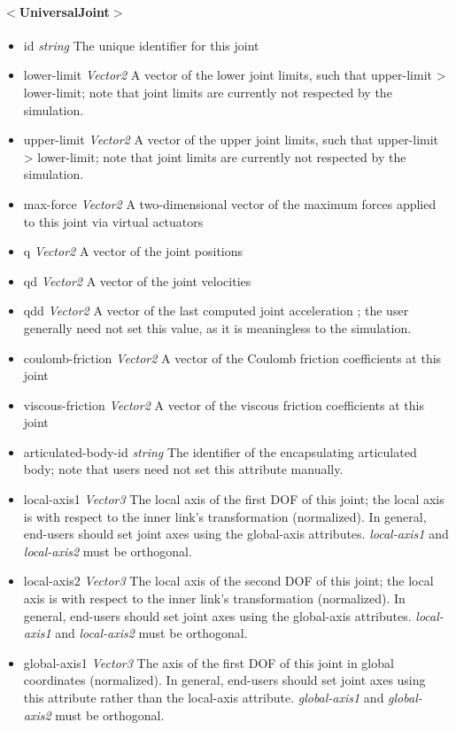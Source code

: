 \documentclass{article}
\begin{document}
\begin{landscape}
\begin{itemize}
\paragraph{$<$UniversalJoint$>$}
\begin{itemize}
 \item id  \emph{string}  The unique identifier for this joint
 \item lower-limit  \emph{Vector2}  A vector of the lower joint limits, such that upper-limit > lower-limit; note that joint limits are currently not respected by the simulation. 
 \item upper-limit  \emph{Vector2}  A vector of the upper joint limits, such that upper-limit > lower-limit; note that joint limits are currently not respected by the simulation.
 \item max-force  \emph{Vector2}  A two-dimensional vector of the maximum forces applied to this joint via virtual actuators 
 \item q  \emph{Vector2}  A vector of the joint positions 
 \item qd  \emph{Vector2}  A vector of the joint velocities 
 \item qdd  \emph{Vector2}  A vector of the last computed joint acceleration ; the user generally need not set this value, as it is meaningless to the simulation.
 \item coulomb-friction  \emph{Vector2}  A vector of the Coulomb friction coefficients at this joint 
 \item viscous-friction  \emph{Vector2}  A vector of the viscous friction coefficients at this joint 
 \item articulated-body-id  \emph{string} The identifier of the encapsulating articulated body; note that users need not set this attribute manually.
\item local-axis1  \emph{Vector3} The local axis of the first DOF of this joint; the local axis is with respect to the inner link's transformation (normalized).  In general, end-users should set joint axes using the global-axis attributes.  \emph{local-axis1} and \emph{local-axis2} must be orthogonal.
\item local-axis2  \emph{Vector3} The local axis of the second DOF of this joint; the local axis is with respect to the inner link's transformation (normalized).  In general, end-users should set joint axes using the global-axis attributes.  \emph{local-axis1} and \emph{local-axis2} must be orthogonal.
\item global-axis1  \emph{Vector3} The axis of the first DOF of this joint in global coordinates (normalized).  In general, end-users should set joint axes using this attribute rather than the local-axis attribute.  \emph{global-axis1} and \emph{global-axis2} must be orthogonal.

\end{itemize}
\end{itemize}
\end{landscape}
\end{document}
